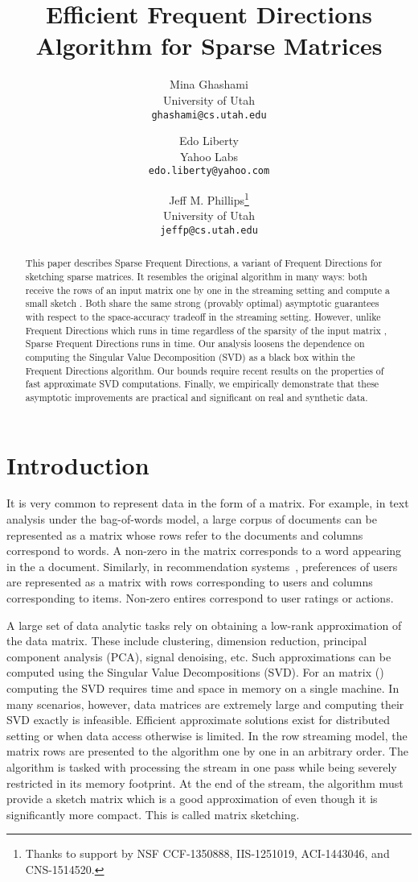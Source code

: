 \documentclass[11pt]{article}
\title{Efficient Frequent Directions Algorithm for Sparse Matrices}
\author{
Mina Ghashami\\ University of Utah \\ \texttt{ghashami@cs.utah.edu}
\and
Edo Liberty\\ Yahoo Labs\\ \texttt{edo.liberty@yahoo.com}
\and
Jeff M. Phillips\thanks{Thanks to support by NSF CCF-1350888, IIS-1251019, ACI-1443046, and CNS-1514520.}\\ University of Utah \\ \texttt{jeffp@cs.utah.edu}
}
\date\nonumber
\begin{document}
\maketitle
\begin{abstract}
This paper describes Sparse Frequent Directions, a variant of Frequent Directions for sketching sparse matrices. 
It resembles the original algorithm in many ways:
both receive the rows of an input matrix  one by one in the streaming setting and compute a small sketch .
Both share the same strong (provably optimal) asymptotic guarantees with respect to the space-accuracy tradeoff in the streaming setting. However, unlike Frequent Directions which runs in  time regardless of the sparsity of the input matrix , Sparse Frequent Directions runs in  time.
Our analysis loosens the dependence on computing the Singular Value Decomposition (SVD) as a black box within the Frequent Directions algorithm. Our bounds require recent results on the properties of fast approximate SVD computations.  
Finally, we empirically demonstrate that these asymptotic improvements are practical and significant on real and synthetic data.  
\end{abstract}

\section{Introduction}
\label{sec:intro}
It is very common to represent data in the form of a matrix. 
For example, in text analysis under the bag-of-words model, a large corpus of documents can be represented as a matrix whose rows refer to the documents and columns correspond to words. A non-zero in the matrix corresponds to a word appearing in the a document. 
Similarly, in recommendation systems~\cite{drineas2002competitive}, preferences of users are represented as a matrix with rows corresponding to users and columns corresponding to items. Non-zero entires correspond to user ratings or actions.

A large set of data analytic tasks rely on obtaining a low-rank approximation of the data matrix. 
These include clustering, dimension reduction, principal component analysis (PCA), signal denoising, etc. 
Such approximations can be computed using the Singular Value Decompositions (SVD).  
For an  matrix  () computing the SVD requires  time and  space in memory on a single machine. 
In many scenarios, however, data matrices are extremely large and computing their SVD exactly is infeasible. 
Efficient approximate solutions exist for distributed setting or when data access otherwise is limited.
In the row streaming model, the matrix rows are presented to the algorithm one by one in an arbitrary order.
The algorithm is tasked with processing the stream in one pass while being severely restricted in its memory footprint. 
At the end of the stream, the algorithm must provide a sketch matrix  which is a good approximation of  even though it is significantly more compact. This is called matrix sketching.
\end{document}
